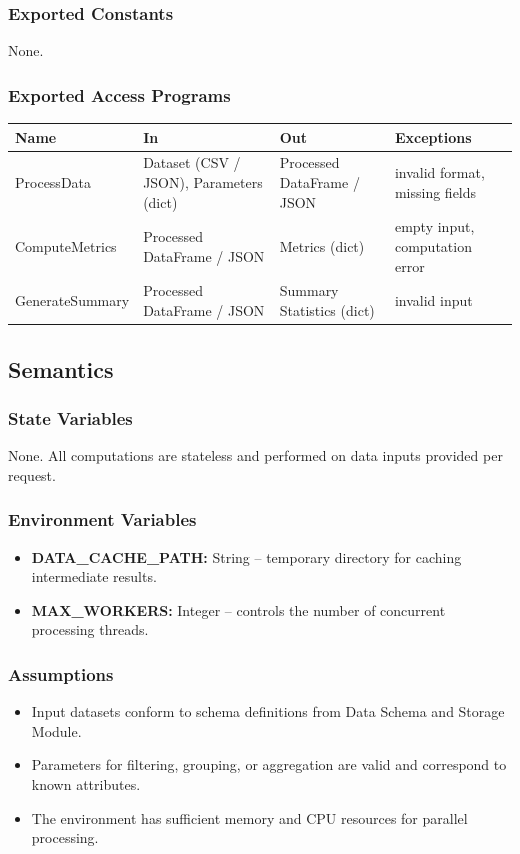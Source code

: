 \documentclass[12pt, titlepage]{article}
\begin{document}
\subsubsection{Exported Constants}
None.

\subsubsection{Exported Access Programs}

\begin{center}
\begin{tabularx}{\textwidth}{l X X X}
\hline
\textbf{Name} & \textbf{In} & \textbf{Out} & \textbf{Exceptions} \\
\hline
ProcessData & Dataset (CSV / JSON), Parameters (dict) & Processed DataFrame / JSON & invalid format, missing fields \\
ComputeMetrics & Processed DataFrame / JSON & Metrics (dict) & empty input, computation error \\
GenerateSummary & Processed DataFrame / JSON & Summary Statistics (dict) & invalid input \\
\hline
\end{tabularx}
\end{center}

\subsection{Semantics}

\subsubsection{State Variables}
None. All computations are stateless and performed on data inputs provided per request.

\subsubsection{Environment Variables}
\begin{itemize}
    \item \textbf{DATA\_CACHE\_PATH:} String – temporary directory for caching intermediate results.
    \item \textbf{MAX\_WORKERS:} Integer – controls the number of concurrent processing threads.
\end{itemize}

\subsubsection{Assumptions}
\begin{itemize}
    \item Input datasets conform to schema definitions from Data Schema and Storage Module.
    \item Parameters for filtering, grouping, or aggregation are valid and correspond to known attributes.
    \item The environment has sufficient memory and CPU resources for parallel processing.
\end{itemize}
\end{document}

